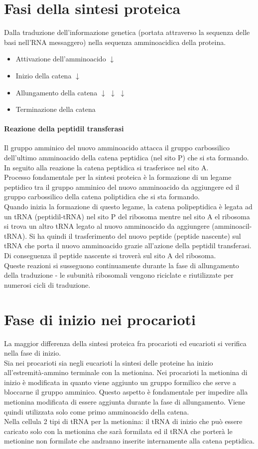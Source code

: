 \documentclass{article}
\begin{document}
\section{Fasi della sintesi proteica}
Dalla traduzione dell'informazione genetica (portata attraverso la sequenza delle basi nell'RNA messaggero) nella sequenza amminoacidica della proteina.
\begin{itemize}
    \item Attivazione dell'amminoacido
    \subitem $\downarrow$
    \item Inizio della catena
    \subitem $\downarrow$
    \item Allungamento della catena
    \subitem $\downarrow$
    \subitem $\downarrow$
    \subitem $\downarrow$
    \item Terminazione della catena
\end{itemize}
\paragraph{Reazione della peptidil transferasi}
Il gruppo amminico del nuovo amminoacido attacca il gruppo carbossilico dell'ultimo amminoacido della catena peptidica (nel sito P) che si sta formando. In seguito
alla reazione la catena peptidica si trasferisce nel sito A.\\
Processo fondamentale per la sintesi proteica è la formazione di un
legame peptidico tra il gruppo amminico del nuovo amminoacido da
aggiungere ed il gruppo carbossilico della catena poliptidica che si sta
formando.\\ Quando inizia la formazione di questo legame, la catena polipeptidica è
legata ad un tRNA (peptidil-tRNA) nel sito P del ribosoma mentre nel sito A
el ribosoma si trova un altro tRNA legato al nuovo amminoacido da
aggiungere (amminoacil-tRNA). Si ha quindi il trasferimento del nuovo peptide (peptide nascente) sul
tRNA che porta il nuovo amminoacido grazie all'azione della peptidil
transferasi. Di conseguenza il peptide nascente si troverà sul sito A
del ribosoma.\\ Queste reazioni si susseguono continuamente durante la fase di
allungamento della traduzione - le subunità ribosomali vengono riciclate e riutilizzate per numerosi cicli di traduzione.
\section{Fase di inizio nei procarioti}
La maggior differenza della sintesi proteica fra procarioti ed eucarioti si verifica nella fase di inizio.\\
Sia nei procarioti sia negli eucarioti la sintesi delle proteine ha inizio all'estremità-ammino terminale con la
metionina. Nei procarioti la metionina di inizio è modificata in quanto viene aggiunto un gruppo
formilico che serve a bloccarne il gruppo amminico. Questo aspetto è fondamentale per
impedire alla metionina modificata di essere aggiunta durante la fase di allungamento.
Viene quindi utilizzata solo come primo amminoacido della catena.\\
Nella cellula 2 tipi di tRNA per la metionina: il tRNA di inizio che può essere caricato solo
con la metionina che sarà formilata ed il tRNA che porterà le metionine non formilate
che andranno inserite internamente alla catena peptidica.
\end{document}
